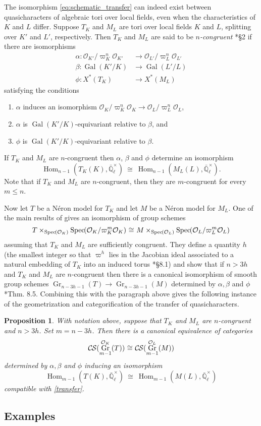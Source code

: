 \documentclass[10pt]{amsart}
\theoremstyle{plain}
\newtheorem{proposition}[theorem]{Proposition}
\theoremstyle{definition}
\theoremstyle{remark}
\newcommand{\EE}{\mathbb{\bar Q}_\ell}
\newcommand{\OK}{\mathcal{O}_K}
\newcommand{\OL}{\mathcal{O}_L}
\newcommand{\OO}[1]{\mathcal{O}_{#1}}
\newcommand{\EEx}{\EE^\times}
\DeclareMathOperator{\Gal}{Gal}
\DeclareMathOperator{\Hom}{Hom}
\DeclareMathOperator{\Gr}{Gr}
\newcommand{\Spec}[1]{{\operatorname{Spec}\hskip-1pt( #1 )}}
\newcommand{\iso}{{\ \cong\ }}
\newcommand{\CS}{{\mathcal{C\hskip-0.8pt S}}}
\begin{document}
The isomorphism \eqref{eq:schematic_transfer} can indeed exist between quasicharacters of algebraic tori over local fields, even when the characteristics of $K$ and $L$ differ.
Suppose $T_K$ and $M_L$ are tori over local fields $K$ and $L$,
splitting over $K'$ and $L'$, respectively.
Then $T_K$ and $M_L$ are said to be \emph{$n$-congruent} \cite{chai-yu:01a}*{\S 2} if there are isomorphisms
 \begin{align*}
  \alpha : \OO{K'}/\varpi_K^n \OO{K'} &\to \OO{L'}/\varpi_{L}^n \OO{L'} \\
  \beta : \Gal(K'/K) &\to \Gal(L'/L) \\
  \phi : X^*(T_K) &\to X^*(M_L)
 \end{align*}
 satisfying the conditions
 \begin{enumerate}
  \item $\alpha$ induces an isomorphism $\OK/\varpi_K^n \OK \to \OO{L}/\varpi_{L}^n \OO{L}$,
  \item $\alpha$ is $\Gal(K'/K)$-equivariant relative to $\beta$, and
  \item $\phi$ is $\Gal(K'/K)$-equivariant relative to $\beta$.
 \end{enumerate}
If $T_K$ and $M_L$ are $n$-congruent then $\alpha$, $\beta$ and $\phi$ determine an isomorphism 
\begin{equation}\label{transfer}
  \Hom_{n-1}(T_K(K), \EEx) \iso \Hom_{n-1}(M_L(L),\EEx).
\end{equation}
Note that if $T_K$ and $M_L$ are $n$-congruent, then they are $m$-congruent for every
$m \leq n$.

Now let $T$ be a N\'eron model for $T_K$ and let $M$ be a N\'eron model for $M_L$.
One of the main results of \cite{chai-yu:01a} gives an isomorphism of group schemes 
\[
T \times_{\Spec{\OK}} \Spec{\OK/\varpi_K^m\OK} \iso M \times_{\Spec{\OL}} \Spec{\OL/\varpi_L^m\OL}
\] 
assuming that $T_K$ and $M_L$ are sufficiently congruent.
They define a quantity $h$ (the smallest integer so that $\varpi^h$ lies in the
Jacobian ideal associated to a natural embedding of $T_K$ into an induced torus \cite{chai-yu:01a}*{\S 8.1}) and show  that if $n > 3h$ and $T_K$ and $M_L$ are $n$-congruent then there is a canonical isomorphism of smooth group schemes
 $
\Gr_{n-3h-1}(T) \to \Gr_{n-3h-1}(M)
 $
 determined by $\alpha, \beta$ and $\phi$ \cite{chai-yu:01a}*{Thm. 8.5}.
Combining this with the paragraph above gives the following instance of the geometrization and categorification of the transfer of quasicharacters.

\begin{proposition}\label{prop:transfer}
 With notation above, suppose that $T_K$ and $M_L$ are $n$-congruent and $n > 3h$.  Set $m = n-3h$.
 Then there is a canonical equivalence of categories
 \[
 \CS(\Gr^{\OK}_{m-1}(T)) \iso \CS(\Gr^{\OL}_{m-1}(M))
 \]
 determined by $\alpha, \beta$ and $\phi$ inducing an isomorphism
 \[
\Hom_{m-1}(T(K), \EEx) \iso  \Hom_{m-1}(M(L), \EEx)
 \]
compatible with \eqref{transfer}.
\end{proposition}


\subsection{Examples}

   
\end{document}
